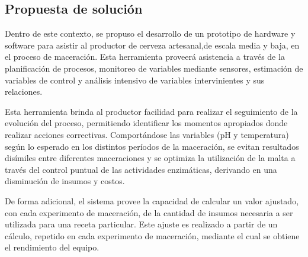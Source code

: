     
    
    
    
    
	
	
	\subsection{ Propuesta de solución }
	\par
    Dentro de este contexto, se propuso el desarrollo de un prototipo de hardware y software para asistir al productor de cerveza artesanal,de escala media y baja, en el proceso de maceración. Esta herramienta proveerá asistencia a través de la planificación de procesos, monitoreo de variables mediante sensores, estimación de variables de control y análisis intensivo de variables intervinientes y sus relaciones.
    \par
    Esta herramienta brinda al productor facilidad para realizar el seguimiento de la evolución del proceso, permitiendo identificar los momentos apropiados donde realizar acciones correctivas. Comportándose las variables (pH y temperatura) según lo esperado en los distintos períodos de la maceración, se evitan resultados disímiles entre diferentes maceraciones y se optimiza la utilización de la malta a través del control puntual de las actividades enzimáticas, derivando en una disminución de insumos y costos.
    \par
    De forma adicional, el sistema provee la capacidad de calcular un valor ajustado, con cada experimento de maceración, de la cantidad de insumos necesaria a ser utilizada para una receta particular. Este ajuste es realizado a partir de un cálculo, repetido en cada experimento de maceración, mediante el cual se obtiene el rendimiento del equipo.
    
